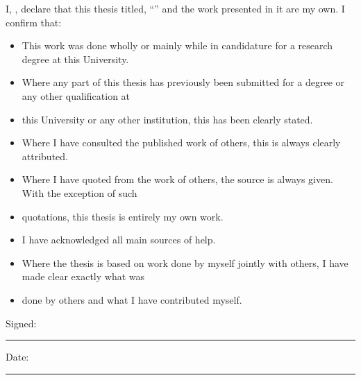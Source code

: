 \documentclass[
    11pt, %
    english, %
    doublespacing, %
    nolistspacing, %
    single
    parskip, %
    headsepline, %
]{MastersDoctoralThesis} %
\begin{document}
    \hypersetup{citecolor=refC}
    \hypersetup{linkcolor=refC}
    \begin{declaration}
        \addchaptertocentry{\authorshipname} %
        \noindent I, \authorname, declare that this thesis titled, \enquote{\ttitle} and the work presented in it are my
        own. I confirm that:

        \begin{itemize}
            \item This work was done wholly or mainly while in candidature for a research degree at this University.
            \item Where any part of this thesis has previously been submitted for a degree or any other qualification at
            \item this University or any other institution, this has been clearly stated.
            \item Where I have consulted the published work of others, this is always clearly attributed.
            \item Where I have quoted from the work of others, the source is always given. With the exception of such
            \item quotations, this thesis is entirely my own work.
            \item I have acknowledged all main sources of help.
            \item Where the thesis is based on work done by myself jointly with others, I have made clear exactly
            what was
            \item done by others and what I have contributed myself.\\
        \end{itemize}

        \noindent Signed:\\
        \rule[0.5em]{25em}{0.5pt} %

        \noindent Date:\\
        \rule[0.5em]{25em}{0.5pt} %
    \end{declaration}

    \cleardoublepage

\end{document}
